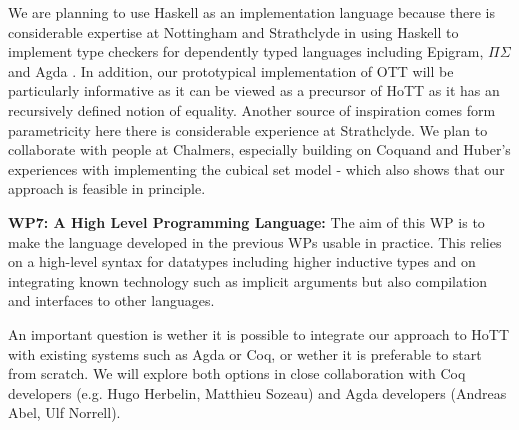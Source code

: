 \documentclass[a4paper,11pt]{article}
\begin{document}
We are planning to use Haskell as an implementation language because
there is considerable expertise at Nottingham and Strathclyde in using
Haskell to implement type checkers for dependently typed languages
including Epigram, $\Pi\Sigma$ and Agda
\cite{alti:checking,easy,alti:pisigma-new}.  In addition, our
prototypical implementation of OTT will be particularly informative as
it can be viewed as a precursor of HoTT as it has an recursively
defined notion of equality. Another source of inspiration comes form parametricity 
here there is considerable experience at Strathclyde.
We plan to collaborate with people at
Chalmers, especially building on Coquand and Huber's experiences with
implementing the cubical set model - which also shows that our
approach is feasible in principle.



{\bf WP7: A High Level Programming Language:} The aim of this WP is to
make the language developed in the previous WPs usable in
practice. This relies on a high-level syntax for datatypes including
higher inductive types and on integrating known technology such as
implicit arguments but also compilation and interfaces to other
languages.

An important question is wether it is possible to integrate our
approach to HoTT with existing systems such as Agda or Coq, or wether
it is preferable to start from scratch. We will explore both options
in close collaboration with Coq developers (e.g. Hugo Herbelin,
Matthieu Sozeau) and Agda developers (Andreas Abel, Ulf Norrell).

\end{document}
